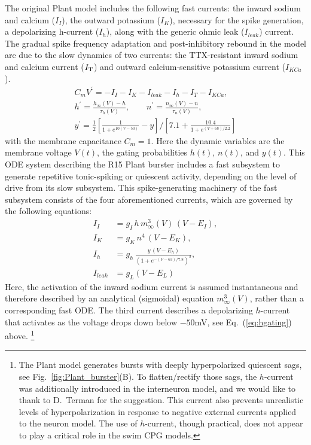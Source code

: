 \documentclass[nofootinbib,aip,amsmath,amssymb,reprint,twocolumn,10pt]{revtex4-2}
\begin{document}
The original Plant model includes the following fast currents: the inward sodium and calcium ($I_{I}$), the outward potassium ($I_K$), necessary for the spike generation, a depolarizing h-current ($I_h$), along with the generic ohmic leak ($I_{leak}$) current. The gradual spike frequency adaptation and post-inhibitory rebound in the model are due to the slow dynamics of two currents: the TTX-resistant inward sodium and calcium current ($I_{\rm T}$) and outward calcium-sensitive potassium current ($I_{KCa}$). 
%
\begin{gather}
C_{m} {V}^\prime= - I_{I} - I_{K} - I_{leak} - I_{h} - I_{T} - I_{KCa}, \label{eq:voltage} ~\\ 	
h^\prime = \frac{h_{\infty}(V)-h}{ {\tau_{h}(V)} }, \qquad 
n^\prime = \frac{n_{\infty}(V)-n}{\tau_{n}(V)}, \label{eq:hngating} \\
y^\prime= \frac{1}{2} \left [ \frac{1}{1+e^{10(V-50)}}-y \right ]/ \left [ 7.1+\frac{10.4}{1+e^{(V+68)/2.2}} \right ] \label{eq:hgating}
\end{gather}
with the membrane capacitance $C_m=1$. Here the dynamic variables are the membrane voltage $V(t)$, the gating probabilities $h(t)$, $n(t)$, and $y(t)$. This ODE system describing the R15 Plant burster includes a fast subsystem to generate repetitive tonic-spiking or quiescent activity, depending on the level of drive from its slow subsystem. This spike-generating machinery of the fast subsystem consists of the four aforementioned currents, which are governed by the following equations:
% 
\begin{align}
I_{I} &= g_{I}\,h\, m^{3}_{\infty}(V)\,(V-E_{I}), \label{eq:icurrent}\\ 
I_{K} &= g_{K} \, n^{4}\, (V-E_{K}), \label{eq:kcurrent} \\ 
I_{h} &= g_{h}\,\frac{y\,(V-E_{h}) }{\left (1+e^{-(V-63)/7.8} \right )^3 } \label{eq:hcurrent}, \\
I_{leak} &= g_{L} (V-E_{L})
\end{align}
Here, the activation of the inward sodium current is assumed instantaneous and therefore described by an analytical (sigmoidal) equation $m_{\infty}^3(V)$, rather than a corresponding fast ODE. The third current describes a depolarizing $h$-current that activates as the voltage drops down below $-50$mV, see Eq.~(\ref{eq:hgating}) above. \footnote{The Plant model generates bursts with deeply hyperpolarized quiescent sags, see Fig.~\ref{fig:Plant_burster}(B). To flatten/rectify those sags, the $h$-current was additionally introduced in the interneuron model, and we would like to thank to D.~Terman for the suggestion. This current also prevents unrealistic levels of hyperpolarization in response to negative external currents applied to the neuron model. The use of $h$-current, though practical, does not appear to play a critical role in the swim CPG models.} 
\end{document}
